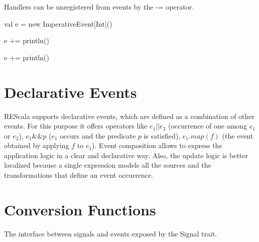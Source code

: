 \documentclass[10pt,a4paper]{article}
\newcommand{\code}[1]{{\fontfamily{cmtt}\small\selectfont#1}}
\newcommand{\REScala}{{\small \sc{REScala}}\xspace}
\begin{document}
Handlers can be unregistered from events by the \code{-=} operator.

\begin{codenv}
val e = new ImperativeEvent[Int]()

e += { println() }


e += { println() }
\end{codenv}




\section{Declarative Events}


REScala supports declarative events, which are defined as a
combination of other events. For this purpose it offers operators like
$e_1||e_2$ (occurrence of one among $e_1$ or $e_2$), $e_1\&\&p$ ($e_1$
occurs and the predicate $p$ is satisfied), $e_1.map(f)$ (the event
obtained by applying $f$ to $e_1$).  Event composition allows to
express the application logic in a clear and declarative way. Also,
the update logic is better localized because a single expression
models all the sources and the transformations that define an event
occurrence.

\section{Conversion Functions}

The \REScala interface between signals and events exposed by the
\code{Signal} trait.
\vspace{2mm}
\end{document}
